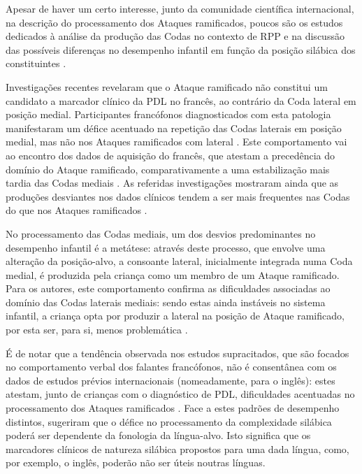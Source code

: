 \documentclass[output=paper,colorlinks,citecolor=brown,booklanguage=portuguese]{langscibook}
\begin{document}
Apesar de haver um certo interesse, junto da comunidade científica internacional, na descrição do processamento dos Ataques ramificados, poucos são os estudos dedicados à análise da produção das Codas no contexto de RPP e na discussão das possíveis diferenças no desempenho infantil em função da posição silábica dos constituintes \citep{Almeida2019, Ferre2015a}.

Investigações recentes revelaram que o Ataque ramificado não constitui um candidato a marcador clínico da PDL no francês, ao contrário da Coda lateral em posição medial. Participantes francófonos diagnosticados com esta patologia manifestaram um défice acentuado na repetição das Codas laterais em posição medial, mas não nos Ataques ramificados com lateral \citep{Almeida2019, Ferre2015a}. Este comportamento vai ao encontro dos dados de aquisição do francês, que atestam a precedência do domínio do Ataque ramificado, comparativamente a uma estabilização mais tardia das Codas mediais \citep{Almeida2011, Rose2000}. As referidas investigações mostraram ainda que as produções desviantes nos dados clínicos tendem a ser mais frequentes nas Codas do que nos Ataques ramificados \citep{Almeida2019}.

No processamento das Codas mediais, um dos desvios predominantes no desempenho infantil é a metátese: através deste processo, que envolve uma alteração da posição-alvo, a consoante lateral, inicialmente integrada numa Coda medial, é produzida pela criança como um membro de um Ataque ramificado. Para os autores, este comportamento confirma as dificuldades associadas ao domínio das Codas laterais mediais: sendo estas ainda instáveis no sistema infantil, a criança opta por produzir a lateral na posição de Ataque ramificado, por esta ser, para si, menos problemática \citep[170]{Almeida2019}.

É de notar que a tendência observada nos estudos supracitados, que são focados no comportamento verbal dos falantes francófonos, não é consentânea com os dados de estudos prévios internacionais (nomeadamente, para o inglês): estes atestam, junto de crianças com o diagnóstico de PDL, dificuldades acentuadas no processamento dos Ataques ramificados \citep{Briscoe2001, Gallon2007, Marshall2009}. Face a estes padrões de desempenho distintos, \citet{Almeida2019} sugeriram que o défice no processamento da complexidade silábica poderá ser dependente da fonologia da língua-alvo. Isto significa que os marcadores clínicos de natureza silábica propostos para uma dada língua, como, por exemplo, o inglês, poderão não ser úteis noutras línguas.
\end{document}
